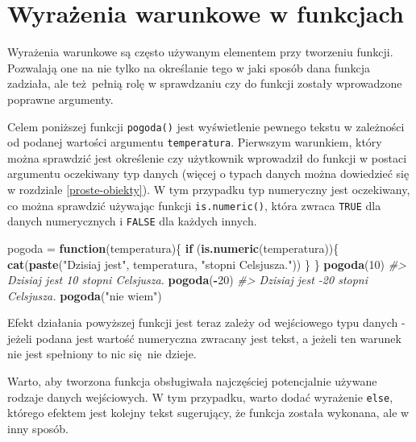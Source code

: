\documentclass[paper=6in:9in,pagesize=pdftex,headinclude=on,footinclude=on,10pt]{scrbook}
\newenvironment{Shaded}{\begin{snugshade}}{\end{snugshade}}
\newcommand{\CommentTok}[1]{\textcolor[rgb]{0.56,0.35,0.01}{\textit{#1}}}
\newcommand{\ControlFlowTok}[1]{\textcolor[rgb]{0.13,0.29,0.53}{\textbf{#1}}}
\newcommand{\DecValTok}[1]{\textcolor[rgb]{0.00,0.00,0.81}{#1}}
\newcommand{\KeywordTok}[1]{\textcolor[rgb]{0.13,0.29,0.53}{\textbf{#1}}}
\newcommand{\NormalTok}[1]{#1}
\newcommand{\OperatorTok}[1]{\textcolor[rgb]{0.81,0.36,0.00}{\textbf{#1}}}
\newcommand{\StringTok}[1]{\textcolor[rgb]{0.31,0.60,0.02}{#1}}
\begin{document}
\hypertarget{wwwf}{%
\section{Wyrażenia warunkowe w funkcjach}\label{wwwf}}

Wyrażenia warunkowe są często używanym elementem przy tworzeniu funkcji.
Pozwalają one na nie tylko na określanie tego w jaki sposób dana funkcja zadziała, ale też~pełnią rolę w sprawdzaniu czy do funkcji zostały wprowadzone poprawne argumenty.

Celem poniższej funkcji \texttt{pogoda()} jest wyświetlenie pewnego tekstu w zależności od podanej wartości argumentu \texttt{temperatura}.
Pierwszym warunkiem, który można sprawdzić jest określenie czy użytkownik wprowadził do funkcji w postaci argumentu oczekiwany typ danych (więcej o typach danych można dowiedzieć się w rozdziale \ref{proste-obiekty}).
W tym przypadku typ numeryczny jest oczekiwany, co można sprawdzić używając funkcji \texttt{is.numeric()}, która zwraca \texttt{TRUE} dla danych numerycznych i \texttt{FALSE} dla każdych innych.

\begin{Shaded}
\begin{Highlighting}[]
\NormalTok{pogoda =}\StringTok{ }\ControlFlowTok{function}\NormalTok{(temperatura)\{}
  \ControlFlowTok{if}\NormalTok{ (}\KeywordTok{is.numeric}\NormalTok{(temperatura))\{}
    \KeywordTok{cat}\NormalTok{(}\KeywordTok{paste}\NormalTok{(}\StringTok{"Dzisiaj jest"}\NormalTok{, temperatura, }\StringTok{"stopni Celsjusza."}\NormalTok{))}
\NormalTok{  \}}
\NormalTok{\}}
\KeywordTok{pogoda}\NormalTok{(}\DecValTok{10}\NormalTok{)}
\CommentTok{#> Dzisiaj jest 10 stopni Celsjusza.}
\KeywordTok{pogoda}\NormalTok{(}\OperatorTok{-}\DecValTok{20}\NormalTok{)}
\CommentTok{#> Dzisiaj jest -20 stopni Celsjusza.}
\KeywordTok{pogoda}\NormalTok{(}\StringTok{"nie wiem"}\NormalTok{)}
\end{Highlighting}
\end{Shaded}

Efekt działania powyższej funkcji jest teraz zależy od wejściowego typu danych - jeżeli podana jest wartość numeryczna zwracany jest tekst, a jeżeli ten warunek nie jest spełniony to nic się~nie dzieje.

Warto, aby tworzona funkcja obsługiwała najczęściej potencjalnie używane rodzaje danych wejściowych.
W tym przypadku, warto dodać wyrażenie \texttt{else}, którego efektem jest kolejny tekst sugerujący, że funkcja została wykonana, ale w inny sposób.
\end{document}
